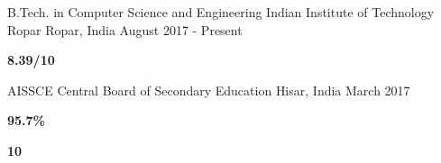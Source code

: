 

\begin{cventries}

  \cventry
    {B.Tech. in Computer Science and Engineering} %
    {Indian Institute of Technology Ropar} %
    {Ropar, India} %
    {August 2017 - Present} %
    {
      \setlength\multicolsep{-12pt}
      \begin{multicols}{2}
      \begin{cvschool} %
        \item[] \textbf{8.39/10}
      \end{cvschool}
      \end{multicols}
    }


\cvedu
    {AISSCE} %
    {Central Board of Secondary Education} %
    {Hisar, India} %
    {March 2017} %
    {
      \setlength\multicolsep{-10pt}
      \begin{multicols}{2}
      \begin{cvschool} %
        \item[] \textbf{95.7\%}
        \item[]  \textbf{10}
      \end{cvschool}
      \end{multicols}
    }


\end{cventries}
